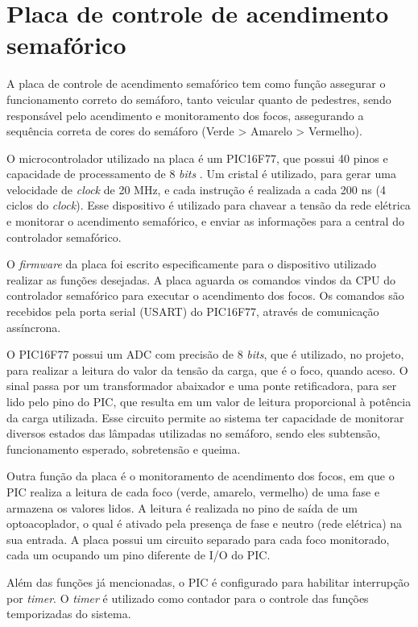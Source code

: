 \section{Placa de controle de acendimento semafórico}

A placa de controle de acendimento semafórico tem como função assegurar o funcionamento correto do semáforo, tanto veicular quanto de pedestres, sendo responsável pelo acendimento e monitoramento dos focos, assegurando a sequência correta de cores do semáforo (Verde > Amarelo > Vermelho)\cite{CET}.

O microcontrolador utilizado na placa é um PIC16F77, que possui 40 pinos e capacidade de processamento de 8 \textit{bits} \cite{PIC}. Um cristal é utilizado, para gerar uma velocidade de \textit{clock} de 20 MHz, e cada instrução é realizada a cada 200 ns (4 ciclos do \textit{clock}). Esse dispositivo é utilizado para chavear a tensão da rede elétrica e monitorar o acendimento semafórico, e enviar as informações para a central do controlador semafórico.

O \textit{firmware} da placa foi escrito especificamente para o dispositivo utilizado realizar as funções desejadas. A placa aguarda os comandos vindos da \ac{CPU} do controlador semafórico para executar o acendimento dos focos. Os comandos são recebidos pela porta serial (\ac{USART}) do PIC16F77, através de comunicação assíncrona.

O PIC16F77 possui um \ac{ADC} com precisão de 8 \textit{bits}, que é utilizado, no projeto, para realizar a leitura do valor da tensão da carga, que é o foco, quando aceso. O sinal passa por um transformador abaixador e uma ponte retificadora, para ser lido pelo pino do PIC, que resulta em um valor de leitura proporcional à potência da carga utilizada. Esse circuito permite ao sistema ter capacidade de monitorar diversos estados das lâmpadas utilizadas no semáforo, sendo eles subtensão, funcionamento esperado, sobretensão e queima.

Outra função da placa é o monitoramento de acendimento dos focos, em que o PIC realiza a leitura de cada foco (verde, amarelo, vermelho) de uma fase e armazena os valores lidos. A leitura é realizada no pino de saída de um optoacoplador, o qual é ativado pela presença de fase e neutro (rede elétrica) na sua entrada. A placa possui um circuito separado para cada foco monitorado, cada um ocupando um pino diferente de \ac{I/O} do PIC.

Além das funções já mencionadas, o PIC é configurado para habilitar interrupção por \textit{timer}. O \textit{timer} é utilizado como contador para o controle das funções temporizadas do sistema. 

